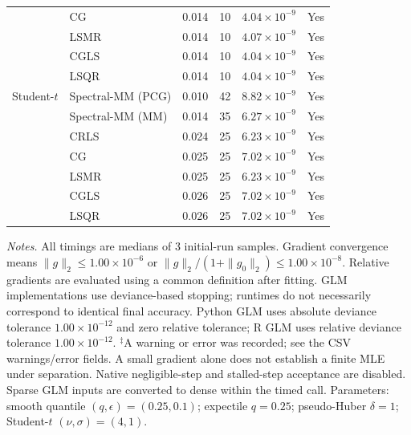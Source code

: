 \documentclass[10pt,a4paper]{article}
\begin{document}
\begin{longtable}{llrrrc}
 & CG & 0.014 & 10 & $4.04\times10^{-9}$ & Yes \\
 & LSMR & 0.014 & 10 & $4.07\times10^{-9}$ & Yes \\
 & CGLS & 0.014 & 10 & $4.04\times10^{-9}$ & Yes \\
 & LSQR & 0.014 & 10 & $4.04\times10^{-9}$ & Yes \\
\midrule
Student-$t$ & Spectral-MM (PCG) & 0.010 & 42 & $8.82\times10^{-9}$ & Yes \\
 & Spectral-MM (MM) & 0.014 & 35 & $6.27\times10^{-9}$ & Yes \\
 & CRLS & 0.024 & 25 & $6.23\times10^{-9}$ & Yes \\
 & CG & 0.025 & 25 & $7.02\times10^{-9}$ & Yes \\
 & LSMR & 0.025 & 25 & $6.23\times10^{-9}$ & Yes \\
 & CGLS & 0.026 & 25 & $7.02\times10^{-9}$ & Yes \\
 & LSQR & 0.026 & 25 & $7.02\times10^{-9}$ & Yes \\
\end{longtable}
\noindent\textit{Notes.} All timings are medians of 3 initial-run samples.
Gradient convergence means $\|g\|_2\leq 1.00\times10^{-6}$ or $\|g\|_2/(1+\|g_0\|_2)\leq 1.00\times10^{-8}$.
Relative gradients are evaluated using a common definition after fitting. GLM implementations use deviance-based stopping; runtimes do not necessarily correspond to identical final accuracy.
Python GLM uses absolute deviance tolerance $1.00\times10^{-12}$ and zero relative tolerance; R GLM uses relative deviance tolerance $1.00\times10^{-12}$.
$^{\ddagger}$A warning or error was recorded; see the CSV warnings/error fields. A small gradient alone does not establish a finite MLE under separation.
Native negligible-step and stalled-step acceptance are disabled.
Sparse GLM inputs are converted to dense within the timed call.
Parameters: smooth quantile $(q,\epsilon)=(0.25,0.1)$; expectile $q=0.25$; pseudo-Huber $\delta=1$; Student-$t$ $(\nu,\sigma)=(4,1)$.
\par
\endgroup
\end{document}
